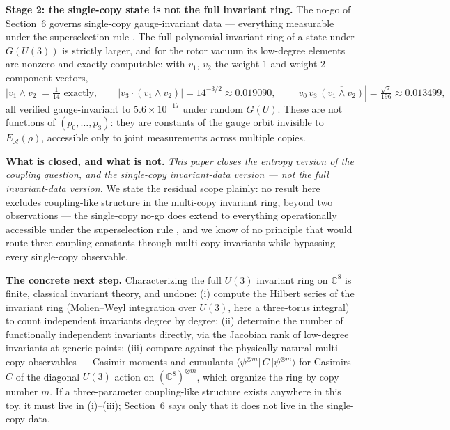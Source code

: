 \documentclass[11pt]{article}
\newcommand{\CC}{\mathbb{C}}
\newcommand{\EA}{E_{\mathcal{A}}}
\begin{document}
\textbf{Stage 2: the single-copy state is not the full invariant ring.} The no-go of Section~6 governs single-copy gauge-invariant data --- everything measurable under the superselection rule \cite{brs}. The full polynomial invariant ring of a state under $G(U(3))$ is strictly larger, and for the rotor vacuum its low-degree elements are nonzero and exactly computable: with $v_1$, $v_2$ the weight-1 and weight-2 component vectors,
\begin{equation*}
|v_1 \wedge v_2| = \tfrac{1}{14} \text{ exactly}, \qquad
|\bar v_3 \cdot (v_1 \wedge v_2)| = 14^{-3/2} \approx 0.019090, \qquad
|\bar v_0\, v_3\, \overline{(v_1 \wedge v_2)}| = \tfrac{\sqrt{7}}{196} \approx 0.013499,
\end{equation*}
all verified gauge-invariant to $5.6 \times 10^{-17}$ under random $G(U)$. These are not functions of $(p_0, \ldots, p_3)$: they are constants of the gauge orbit invisible to $\EA(\rho)$, accessible only to joint measurements across multiple copies.

\textbf{What is closed, and what is not.} \emph{This paper closes the entropy version of the coupling question, and the single-copy invariant-data version --- not the full invariant-data version.} We state the residual scope plainly: no result here excludes coupling-like structure in the multi-copy invariant ring, beyond two observations --- the single-copy no-go does extend to everything operationally accessible under the superselection rule \cite{brs}, and we know of no principle that would route three coupling constants through multi-copy invariants while bypassing every single-copy observable.

\textbf{The concrete next step.} Characterizing the full $U(3)$ invariant ring on $\CC^8$ is finite, classical invariant theory, and undone: (i) compute the Hilbert series of the invariant ring (Molien--Weyl integration over $U(3)$, here a three-torus integral) to count independent invariants degree by degree; (ii) determine the number of functionally independent invariants directly, via the Jacobian rank of low-degree invariants at generic points; (iii) compare against the physically natural multi-copy observables --- Casimir moments and cumulants $\langle \psi^{\otimes m}|\, C \,|\psi^{\otimes m}\rangle$ for Casimirs $C$ of the diagonal $U(3)$ action on $(\CC^8)^{\otimes m}$, which organize the ring by copy number $m$. If a three-parameter coupling-like structure exists anywhere in this toy, it must live in (i)--(iii); Section~6 says only that it does not live in the single-copy data.
\end{document}
